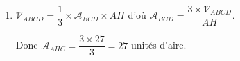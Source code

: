 \begin{enumerate}
\begin{enumerate}
		Donc $\vect{AH}$ est orthogonal aux vecteurs $\vect{BC}$ et $\vect{BD}$, donc à toute combinaison linéaire de ces deux vecteurs, donc à tout vecteur du plan $(BCD)$. Donc $H$ est le projeté orthogonal de $A$ sur le plan $(BCD)$.
		\item La distance du point $A$ au plan $(BCD)$ est égale à $\lVert\vect{AH}\rVert$ :
		
		$\lVert\vect{AH}\rVert=\sqrt{2^2+2^2+(-1)^2}=\sqrt{9}=3$ unités de longueur.
\end{enumerate}
\item $\mathcal{V}_{ABCD}=\dfrac{1}{3}\times \mathcal{A}_{BCD}\times AH$ d'où $\mathcal{A}_{BCD}=\dfrac{3\times \mathcal{V}_{ABCD}}{AH}$.


Donc $\mathcal{A}_{AHC}=\dfrac{3\times 27}{3}=27$ unités d'aire. 
\end{enumerate}
\bigskip
